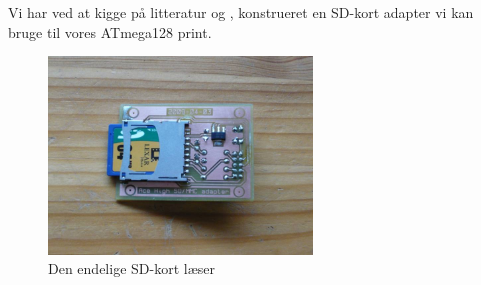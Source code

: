 Vi har ved at kigge på litteratur \cite{web:captain-mmc} og
\cite{web:sd-pinout}, konstrueret en SD-kort adapter vi kan bruge til
vores ATmega128 print.

\begin{figure}[htbp]
  \centering
  \includegraphics[width=7cm]{./img/sd-adapter}
  \caption{Den endelige SD-kort læser}
  \label{fig:tegnehoved-skitse}
\end{figure}



